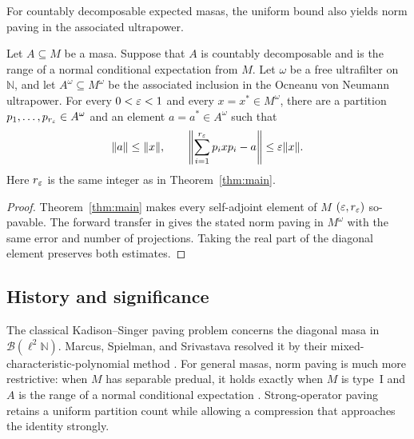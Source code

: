 For countably decomposable expected masas, the uniform bound also yields norm paving in the associated ultrapower.

\begin{corollary}\label{cor:ultrapower-paving}
Let $A\subseteq M$ be a masa. Suppose that $A$ is countably decomposable and is the range of a normal conditional expectation from $M$. Let $\omega$ be a free ultrafilter on $\mathbb N$, and let $A^\omega\subseteq M^\omega$ be the associated inclusion in the Ocneanu von Neumann ultrapower. For every $0<\varepsilon<1$ and every $x=x^*\in M^\omega$, there are a partition $p_1,\ldots,p_{r_\varepsilon}\in A^\omega$ and an element $a=a^*\in A^\omega$ such that
\[
 \|a\|\le\|x\|,
 \qquad
 \left\|\sum_{i=1}^{r_\varepsilon}p_i x p_i-a\right\|\le\varepsilon\|x\|.
\]
Here $r_\varepsilon$ is the same integer as in Theorem~\ref{thm:main}.
\end{corollary}

\begin{proof}
Theorem~\ref{thm:main} makes every self-adjoint element of $M$ $(\varepsilon,r_\varepsilon)$ so-pavable. The forward transfer in \cite[Theorem~2.7(3)]{PV15} gives the stated norm paving in $M^\omega$ with the same error and number of projections. Taking the real part of the diagonal element preserves both estimates.
\end{proof}

\subsection{History and significance}

The classical Kadison--Singer paving problem concerns the diagonal masa in $\mathcal B(\ell^2\mathbb N)$. Marcus, Spielman, and Srivastava resolved it by their mixed-characteristic-polynomial method \cite{MSS15}. For general masas, norm paving is much more restrictive: when $M$ has separable predual, it holds exactly when $M$ is type~I and $A$ is the range of a normal conditional expectation \cite[Theorem~3.3]{PV15}. Strong-operator paving retains a uniform partition count while allowing a compression that approaches the identity strongly.

